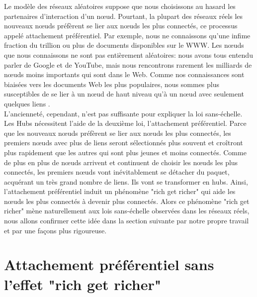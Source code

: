 Le modèle des réseaux aléatoires suppose que nous choisissons au hasard les partenaires d'interaction d'un nœud. Pourtant, la plupart des réseaux réels les nouveaux nœuds préfèrent se lier aux nœuds les plus connectés, ce processus appelé attachement préférentiel. Par exemple, nous ne connaissons qu'une infime fraction du trillion ou plus de documents disponibles sur le WWW. Les nœuds que nous connaissons ne sont pas entièrement aléatoires: nous avons tous entendu parler de Google et de YouTube, mais nous rencontrons rarement les milliards de nœuds moins importants qui sont dans le Web. Comme nos connaissances sont biaisées vers les documents Web les plus populaires, nous sommes plus susceptibles de se lier à un nœud de haut niveau qu'à un nœud avec seulement quelques liens \cite{Barabasi2002}.\\
L'ancienneté, cependant, n'est pas suffisante pour expliquer la loi sans-échelle. Les Hubs nécessitent l'aide de la deuxième loi, l'attachement préférentiel. Parce que les nouveaux nœuds préfèrent se lier aux nœuds les plus connectés, les premiers nœuds avec plus de liens seront sélectionnés plus souvent et croîtront plus rapidement que les autres qui sont plus jeunes et moins connectés. Comme de plus en plus de nœuds arrivent et continuent de choisir les nœuds les plus connectés, les premiers nœuds vont inévitablement se détacher du paquet, acquérant un très grand nombre de liens. Ils vont se transformer en hubs. Ainsi, l'attachement préférentiel induit un phénomène "rich get richer" qui aide les nœuds les plus connectés à devenir plus connectés. Alors ce phénomène "rich get richer" mène naturellement aux lois sans-échelle observées dans les réseaux réels, nous allons confirmer cette idée dans la section suivante par notre propre travail et par une façons plus rigoureuse.
\begin{sloppypar}
\section{Attachement préférentiel sans l'effet "rich get richer"}
\end{sloppypar}
